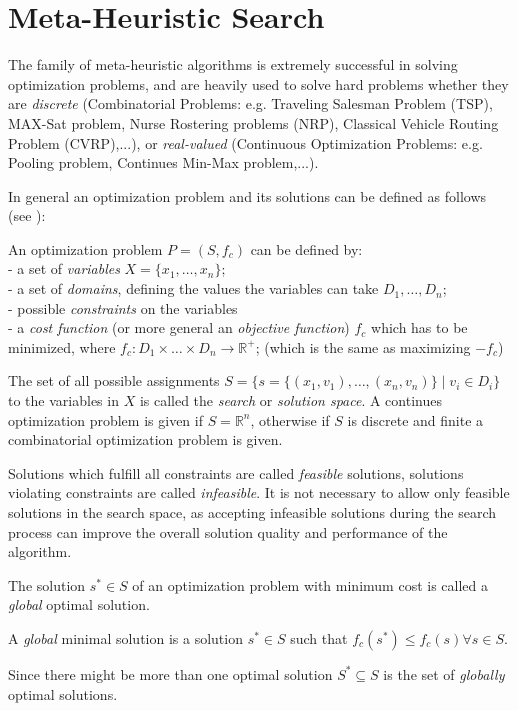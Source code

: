 \section{Meta-Heuristic Search}\label{sec:meta}
The family of meta-heuristic algorithms is extremely successful in solving optimization problems, and are heavily used to solve hard problems whether they are  \emph{discrete} (Combinatorial Problems: e.g. Traveling Salesman Problem (TSP), MAX-Sat problem, Nurse Rostering problems (NRP), Classical Vehicle Routing Problem (CVRP),...), or \emph{real-valued} (Continuous Optimization Problems: e.g. Pooling problem, Continues Min-Max problem,...).

In general an optimization problem and its solutions can be defined as follows (see \cite{blum2003metaheuristics}): 
\begin{definition}\label{def:problem}
An optimization problem $P = (S, f_c)$ can be defined by:\\
- a set of \emph{variables} $X = \{x_1,\dots,x_n\} $;\\
- a set of \emph{domains}, defining the values the variables can take $D_1,\dots,D_n$;\\
- possible \emph{constraints} on the variables\\
- a \emph{cost function} (or more general an \emph{objective function}) $f_c$ which has to be minimized, where $f_c:D_1 \times \dots \times D_n \rightarrow \mathbb{R}^+$; (which is the same as maximizing $-f_c$)\\
\end{definition}
The set of all possible assignments $S = \{s = \{(x_1,v_1),\dots,(x_n,v_n)\}\mid v_i \in D_i\}$ to the variables in $X$ is called the \emph{search} or \emph{solution space}.
A continues optimization problem is given if $S=\mathbb{R}^n$, otherwise if $S$ is discrete and finite a combinatorial optimization problem is given. 

Solutions which fulfill all constraints are called \emph{feasible} solutions, solutions violating constraints are called \emph{infeasible}. 
It is not necessary to allow only feasible solutions in the search space, as accepting infeasible solutions during the search process can improve the overall solution quality and performance of the algorithm.

The solution $s^*\in S$ of an optimization problem with minimum cost is called a \emph{global} optimal solution. 
\begin{definition}
 A \emph{global} minimal solution is a solution $s^* \in S$ such that
 $f_c(s^*)\leq f_c(s) \forall s \in S$. 
\end{definition}
Since there might be more than one optimal solution $S^* \subseteq S$ is the set of \emph{globally} optimal solutions.

